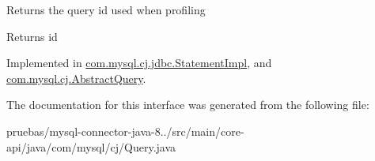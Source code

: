 Returns the query id used when profiling

\begin{DoxyReturn}{Returns}
id 
\end{DoxyReturn}


Implemented in \mbox{\hyperlink{classcom_1_1mysql_1_1cj_1_1jdbc_1_1_statement_impl_a42a752f62a59215845a9faf514893dba}{com.\+mysql.\+cj.\+jdbc.\+Statement\+Impl}}, and \mbox{\hyperlink{classcom_1_1mysql_1_1cj_1_1_abstract_query_a68f5ab0f91a8e8343951099d44860d36}{com.\+mysql.\+cj.\+Abstract\+Query}}.



The documentation for this interface was generated from the following file\+:\begin{DoxyCompactItemize}
\item 
pruebas/mysql-\/connector-\/java-\/8../src/main/core-\/api/java/com/mysql/cj/Query.\+java\end{DoxyCompactItemize}
